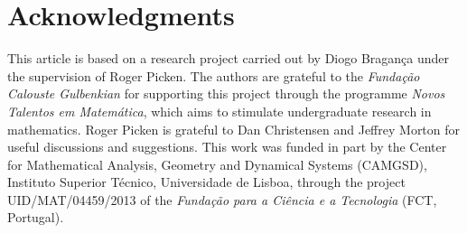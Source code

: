 \documentclass[a4paper,11pt]{article}
\begin{document}
\section{Acknowledgments}

This article is based on a research project carried out by Diogo Bragança under the supervision of  Roger Picken. The authors are grateful to the {\em Fundação Calouste Gulbenkian} for supporting this project through the programme {\em Novos Talentos em Matemática}, which aims to stimulate undergraduate research in mathematics.  
Roger Picken is grateful to Dan Christensen and Jeffrey Morton for useful discussions and suggestions. This work was funded in part by the Center for Mathematical Analysis, Geometry and Dynamical Systems (CAMGSD),
Instituto Superior T\'ecnico, Universidade de Lisboa, through the project UID/MAT/04459/2013 of the {\em Fundação para a Ciência e a Tecnologia} (FCT, Portugal).
\end{document}
